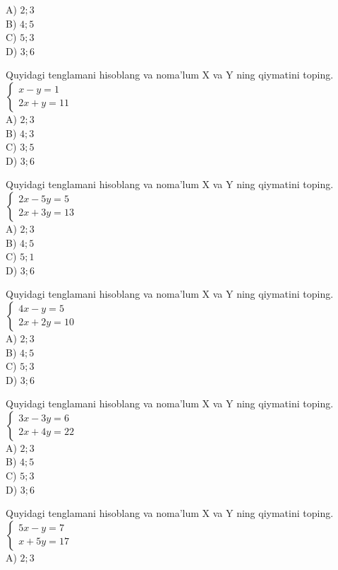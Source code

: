 A) $2 ; 3$\\
B) $4 ; 5$\\
C) $5 ; 3$\\
D) $3 ; 6$
  \item Quyidagi tenglamani hisoblang va noma'lum X va Y ning qiymatini toping. $\left\{\begin{array}{c}x-y=1 \\ 2 x+y=11\end{array}\right.$\\
A) $2 ; 3$\\
B) $4 ; 3$\\
C) $3 ; 5$\\
D) $3 ; 6$
  \item Quyidagi tenglamani hisoblang va noma'lum X va Y ning qiymatini toping. $\left\{\begin{array}{c}2 x-5 y=5 \\ 2 x+3 y=13\end{array}\right.$\\
A) $2 ; 3$\\
B) $4 ; 5$\\
C) $5 ; 1$\\
D) $3 ; 6$
  \item Quyidagi tenglamani hisoblang va noma'lum X va Y ning qiymatini toping. $\left\{\begin{array}{c}4 x-y=5 \\ 2 x+2 y=10\end{array}\right.$\\
A) $2 ; 3$\\
B) $4 ; 5$\\
C) $5 ; 3$\\
D) $3 ; 6$
  \item Quyidagi tenglamani hisoblang va noma'lum X va Y ning qiymatini toping. $\left\{\begin{array}{c}3 x-3 y=6 \\ 2 x+4 y=22\end{array}\right.$\\
A) $2 ; 3$\\
B) $4 ; 5$\\
C) $5 ; 3$\\
D) $3 ; 6$
  \item Quyidagi tenglamani hisoblang va noma'lum X va Y ning qiymatini toping. $\left\{\begin{array}{c}5 x-y=7 \\ x+5 y=17\end{array}\right.$\\
A) $2 ; 3$\\
